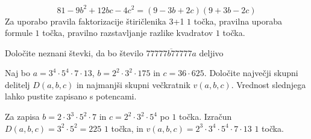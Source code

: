 \documentclass[addpoints]{exam}
\begin{document}
\begin{questions}
\begin{parts}
        \begin{solution}[3cm]
            $$81-9b^2+12bc-4c^2=(9-3b+2c)(9+3b-2c)$$
            Za uporabo pravila faktorizacije štiričlenika 3+1 $1$ točka, pravilna uporaba formule $1$ točka, pravilno razstavljanje razlike kvadratov $1$ točka.
        \end{solution}


    \end{parts}



    \question
    Določite neznani števki, da bo število $\overline{77777b77777a}$ deljivo




    \question[4]
    Naj bo $a=3^4\cdot 5^4\cdot 7\cdot 13$, $b=2^2\cdot 3^2\cdot 175$ in $c=36\cdot 625$. 
    Določite največji skupni delitelj $D(a,b,c)$ in najmanjši skupni večkratnik $v(a,b,c)$. Vrednost slednjega lahko pustite zapisano s potencami.

    \begin{solution}[7cm]
        Za zapisa $b=2\cdot 3^3\cdot 5^2\cdot 7$ in $c=2^2\cdot 3^2\cdot 5^4$ po $1$ točka. 
        Izračun $D(a,b,c)=3^2\cdot 5^2=225$ $1$ točka, in $v(a,b,c)=2^3\cdot 3^4\cdot 5^4\cdot 7\cdot 13$ $1$ točka.
    \end{solution}
    

\end{questions}
\end{document}
